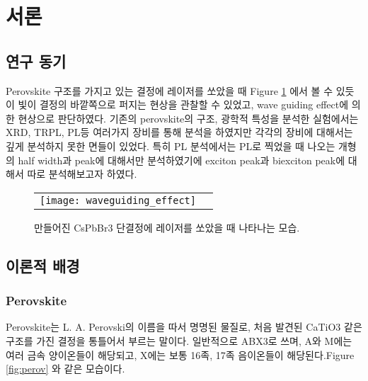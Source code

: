 
\section{서론}
\subsection{연구 동기}
Perovskite 구조를 가지고 있는 결정에 레이저를 쏘았을 때 Figure \ref{fig:waveguide} 에서 볼 수 있듯이 빛이 결정의 바깥쪽으로 퍼지는 현상을 관찰할 수 있었고, wave guiding effect에 의한 현상으로 판단하였다. 기존의 perovskite의 구조, 광학적 특성을 분석한 실험에서는 XRD, TRPL, PL등 여러가지 장비를 통해 분석을 하였지만 각각의 장비에 대해서는 깊게 분석하지 못한 면들이 있었다. 특히 PL 분석에서는 PL로 찍었을 때 나오는 개형의 half width과 peak에 대해서만 분석하였기에 exciton peak과 biexciton peak에 대해서 따로 분석해보고자 하였다. 
 
\begin{figure}[t]
	\begin{center}
		\begin{tabular}{cc}
			\texttt{[image: waveguiding\_effect]}
		\end{tabular}
	\end{center}
	\caption{만들어진 CsPbBr3 단결정에 레이저를 쏘았을 때 나타나는 모습.}
	\label{fig:waveguide}  
\end{figure}
\subsection{이론적 배경}
\subsubsection{Perovskite}
Perovskite는 L. A. Perovski의 이름을 따서 명명된 물질로, 처음 발견된 CaTiO3  같은 구조를 가진 결정을 통틀어서 부르는 말이다. 일반적으로 ABX3로 쓰며, A와 M에는 여러 금속 양이온들이 해당되고, X에는 보통 16족, 17족 음이온들이 해당된다.Figure \ref{fig:perov} 와 같은 모습이다.

